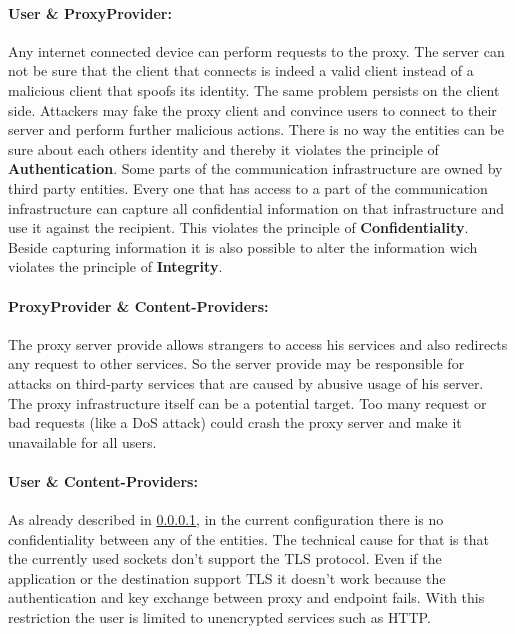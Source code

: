 \documentclass[12pt, a4paper]{scrartcl}
\begin{document}
\paragraph{User \& ProxyProvider:}\label{ssec::user}
\noindent Any internet connected device can perform requests to the proxy. The server can not be sure that the client that connects is indeed a valid client instead of a malicious client that spoofs its identity. The same problem persists on the client side. Attackers may fake the proxy client and convince users to connect to their server and perform further malicious actions. There is no way the entities can be sure about each others identity and thereby it violates the principle of \textbf{Authentication}.\newline
Some parts of the communication infrastructure are owned by third party entities. Every one that has access to a part of the communication infrastructure can capture all confidential information on that infrastructure and use it against the recipient. This violates the principle of \textbf{Confidentiality}.\newline
Beside capturing information it is also possible to alter the information wich violates the principle of \textbf{Integrity}.
\paragraph{ProxyProvider \& Content-Providers:}
The proxy server provide allows strangers to access his services and also redirects any request to other services. So the server provide may be responsible for attacks on third-party services that are caused by abusive usage of his server.\newline
The proxy infrastructure itself can be a potential target. Too many request or bad requests (like a \ac{DoS} attack) could crash the proxy server and make it unavailable for all users.
\paragraph{User \& Content-Providers:}
As already described in \@\ref{ssec::user}, in the current configuration there is no confidentiality between any of the entities. The technical cause for that is that the currently used sockets don't support the \ac{TLS} protocol. Even if the application or the destination support \ac{TLS} it doesn't work because the authentication and key exchange between proxy and endpoint fails. With this restriction the user is limited to unencrypted services such as \acs{HTTP}.
\end{document}
